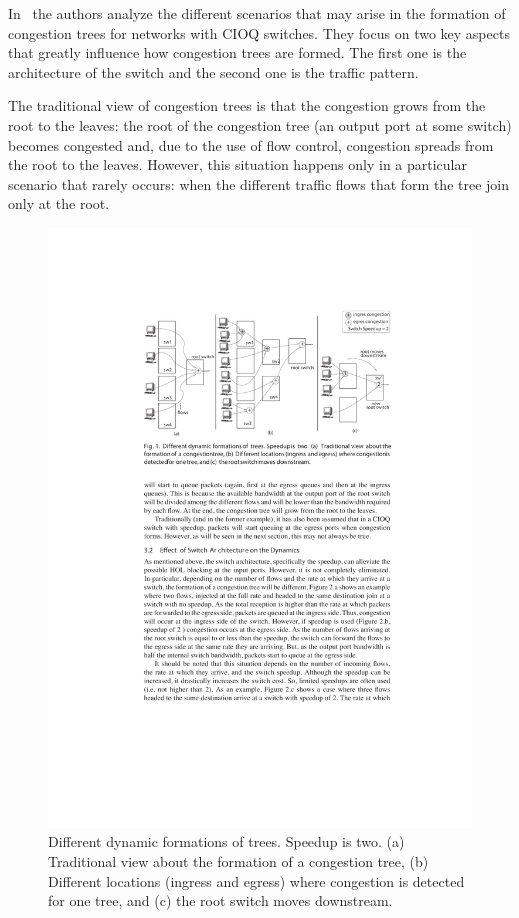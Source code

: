 \documentclass[12pt]{article}
\begin{document}
In~\cite{paper1} the authors analyze the different scenarios that may arise in the formation of congestion trees for networks with CIOQ switches. They focus on two key aspects that greatly influence how congestion trees are formed. The first one is the architecture of the switch and the second one is the traffic pattern. 

The traditional view of congestion trees is that the congestion grows from the root to the leaves: the root of the congestion tree (an output port at some switch) becomes congested and, due to the use of flow control, congestion spreads from the root to the leaves. However, this situation happens only in a particular scenario that rarely occurs: when the different traffic flows that form the tree join only at the root.

\begin{figure}[ht]
	\centering
		\includegraphics{congestion_dynamics.pdf}
		\caption{Different dynamic formations of trees. Speedup is two. (a) Traditional view about the formation of a congestion tree, (b) Different locations (ingress and egress) where congestion is detected for one tree, and (c) the root switch moves downstream.}
		\label{fig:congestion_dynamics}
\end{figure}
\end{document}
